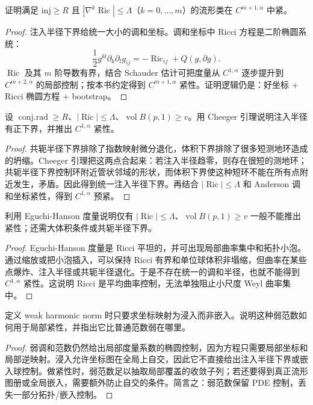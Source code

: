\documentclass[11pt,a4paper,openany]{ctexbook}
\numberwithin{equation}{chapter}
\begin{document}
\begin{exercise}
证明满足 \(\mathrm{inj}\ge R\) 且 \(|\nabla^k\operatorname{Ric}|\le\Lambda\)（\(k=0,\ldots,m\)）的流形类在 \(C^{m+1,\alpha}\) 中紧。
\end{exercise}
\begin{proof}
注入半径下界给统一大小的调和坐标。调和坐标中 Ricci 方程是二阶椭圆系统：
\[
\frac12g^{kl}\partial_k\partial_lg_{ij}=-\operatorname{Ric}_{ij}+Q(g,\partial g).
\]
\(\operatorname{Ric}\) 及其 \(m\) 阶导数有界，结合 Schauder 估计可把度量从 \(C^{1,\alpha}\) 逐步提升到 \(C^{m+2,\alpha}\) 的局部控制；按本书约定得到 \(C^{m+1,\alpha}\) 紧性。证明逻辑仍是：好坐标 + Ricci 椭圆方程 + bootstrap。
\end{proof}

\begin{exercise}
设 \(\operatorname{conj.rad}\ge R\)、\(|\operatorname{Ric}|\le\Lambda\)、\(\operatorname{vol}B(p,1)\ge v\)。用 Cheeger 引理说明注入半径有正下界，并推出 \(C^{1,\alpha}\) 紧性。
\end{exercise}
\begin{proof}
共轭半径下界排除了指数映射微分退化，体积下界排除了很多短测地环造成的坍缩。Cheeger 引理把这两点合起来：若注入半径趋零，则存在很短的测地环；共轭半径下界控制环附近管状邻域的形状，而体积下界使这种短环不能在所有点附近发生，矛盾。因此得到统一注入半径下界。再结合 \(|\operatorname{Ric}|\le\Lambda\) 和 Anderson 调和坐标紧性，得到 \(C^{1,\alpha}\) 预紧。
\end{proof}

\begin{exercise}
利用 Eguchi-Hanson 度量说明仅有 \(|\operatorname{Ric}|\le\Lambda\)、\(\operatorname{vol}B(p,1)\ge v\) 一般不能推出紧性；还需大体积条件或共轭半径下界。
\end{exercise}
\begin{proof}
Eguchi-Hanson 度量是 Ricci 平坦的，并可出现局部曲率集中和拓扑小泡。通过缩放或把小泡插入，可以保持 Ricci 有界和单位球体积非塌缩，但曲率在某些点爆炸、注入半径或共轭半径退化。于是不存在统一的调和半径，也就不能得到 \(C^{1,\alpha}\) 紧性。这说明 Ricci 是平均曲率控制，无法单独阻止小尺度 Weyl 曲率集中。
\end{proof}

\begin{exercise}
定义 weak harmonic norm 时只要求坐标映射为浸入而非嵌入。说明这种弱范数如何用于局部紧性，并指出它比普通范数弱在哪里。
\end{exercise}
\begin{proof}
弱调和范数仍然给出局部度量系数的椭圆控制，因为方程只需要局部坐标和局部逆映射。浸入允许坐标图在全局上自交，因此它不直接给出注入半径下界或嵌入球控制。做紧性时，弱范数足以抽取局部覆盖的收敛子列；若还要得到真正流形图册或全局嵌入，需要额外防止自交的条件。简言之：弱范数保留 PDE 控制，丢失一部分拓扑/嵌入控制。
\end{proof}
\end{document}
